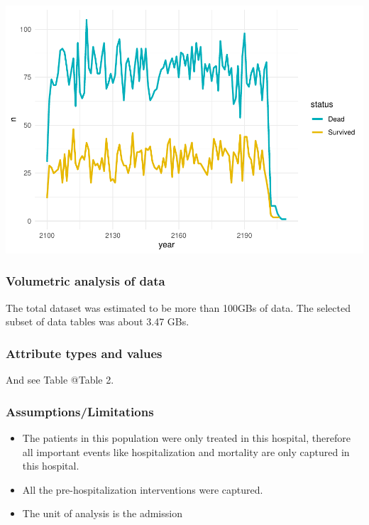 \documentclass[
]{article}
\providecommand{\tightlist}{%
  \setlength{\itemsep}{0pt}\setlength{\parskip}{0pt}}
\begin{document}
\includegraphics{MyReport_files/figure-latex/unnamed-chunk-4-1.pdf}

\hypertarget{volumetric-analysis-of-data}{%
\subsubsection{Volumetric analysis of
data}\label{volumetric-analysis-of-data}}

The total dataset was estimated to be more than 100GBs of data. The
selected subset of data tables was about 3.47 GBs.

\hypertarget{attribute-types-and-values}{%
\subsubsection{Attribute types and
values}\label{attribute-types-and-values}}

And see Table @Table 2.

\hypertarget{assumptionslimitations}{%
\subsubsection{Assumptions/Limitations}\label{assumptionslimitations}}

\begin{itemize}
\tightlist
\item
  The patients in this population were only treated in this hospital,
  therefore all important events like hospitalization and mortality are
  only captured in this hospital.
\item
  All the pre-hospitalization interventions were captured.
\item
  The unit of analysis is the admission
\end{itemize}
\end{document}
